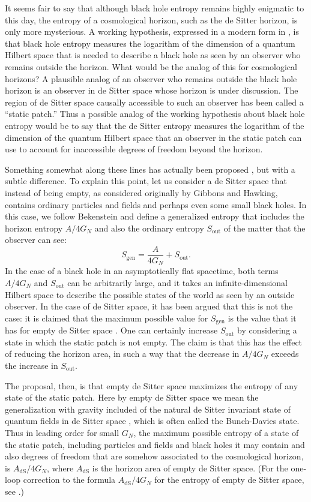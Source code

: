 \documentclass[11pt,a4paper]{article}
\def\be{\begin{equation}}
\def\ee{\end{equation}}
\def\dS{{\mathrm{dS}}}
\def\gen{{\mathrm{gen}}}
\def\out{{\mathrm{out}}}
\begin{document}
It seems fair to say that although black hole entropy remains highly enigmatic to this day,  the entropy of a cosmological horizon, such as the de Sitter horizon,
 is only more mysterious.
A working hypothesis, expressed in a modern form in \cite{Review}, is that black hole entropy measures the logarithm of the dimension
 of a quantum Hilbert space that is needed
to describe a black hole as seen by an observer who remains outside the horizon.
 What would be the analog of this for cosmological horizons?   A plausible   analog of an observer who remains outside the black hole horizon is an observer in
 de Sitter space
 whose horizon is under discussion.    The region of de Sitter space causally accessible to such an observer has been called a ``static patch.''   
 Thus a possible analog of the working hypothesis about black hole entropy would be to say that the de Sitter entropy measures the logarithm of the dimension
  of the quantum
 Hilbert space that an observer in the static patch can use to account for  inaccessible degrees of freedom beyond the horizon.
 
 Something somewhat along these lines has actually been proposed \cite{BoussoOne,BoussoTwo,Banks,BanksFischler,BanksOne,BanksTwo,BFTwo,SusskindA,Susskind}, but with a subtle difference.    To explain this point,
 let us consider a de Sitter space that instead of being empty, as considered originally by Gibbons and Hawking, contains ordinary particles and fields and perhaps
 even some small  black holes.   In this case, we follow Bekenstein and define a generalized entropy that includes the horizon entropy $A/4G_N$ and also the
 ordinary entropy $S_\out$ of the matter that the observer can see:
 \be\label{sgen}S_\gen=\frac{A}{4 G_N} +S_\out. \ee
 In the case of a black hole in an asymptotically flat spacetime, both terms $A/4G_N$ and $S_\out$ can be arbitrarily large, and it takes an 
 infinite-dimensional Hilbert space to describe the possible states of the world as seen by an outside observer.   In the case of de Sitter space, it has been
 argued that this is not the case:  it is claimed that the maximum possible value for $S_\gen$ is the value that it has for empty de Sitter space \cite{Maede,BoussoOne,BoussoTwo}.    One can certainly
 increase $S_\out$ by considering a state in which the static patch is not empty. The claim is that this has the effect of reducing the horizon area, in such a way that the
 decrease in $A/4G_N$ exceeds the increase in $S_\out$.   
 
 The proposal, then, is that empty de Sitter space maximizes the entropy of any state of the static patch. 
  Here by empty de Sitter space we mean the generalization with gravity included of the natural de Sitter invariant state of quantum fields in de Sitter space  \cite{CT,SS,BD,Mo,Al}, which
 is often called the Bunch-Davies state.   
 Thus in leading order for small $G_N$, 
 the maximum possible entropy of a state of the static patch, including particles and fields and black holes
  it may contain and also degrees of freedom
 that are somehow associated to the cosmological horizon, is $A_\dS/4G_N$, where $A_\dS$ is the horizon area  of empty de Sitter space.   (For the one-loop correction
 to the formula $A_\dS/4G_N$ for the entropy of empty de Sitter space, see \cite{Denef}.)
 
\end{document}

